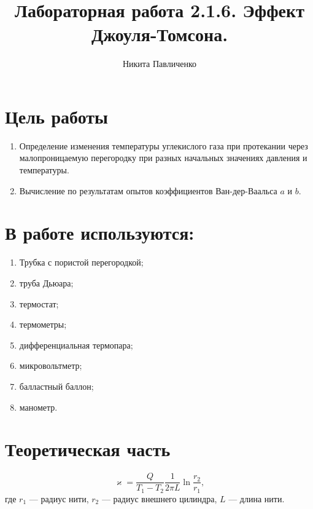 \documentclass[12pt]{article}
\title{Лабораторная работа 2.1.6. Эффект Джоуля-Томсона.}
\author{Никита Павличенко}
\begin{document}
\maketitle
{}%
\thispagestyle{fancy}
\newpage
\section{Цель работы}
\begin{enumerate}
    \item Определение изменения температуры углекислого газа при протекании через малопроницаемую перегородку при разных начальных значениях давления и температуры.
    \item Вычисление по результатам опытов коэффициентов Ван-дер-Ваальса $a$ и $b$.
\end{enumerate}
\section{В работе используются:}
\begin{enumerate}
    \item Трубка с пористой перегородкой;
    \item труба Дьюара;
    \item термостат;
    \item термометры;
    \item дифференциальная термопара;
    \item микровольтметр;
    \item балластный баллон;
    \item манометр.
\end{enumerate}

\section{Теоретическая часть}

\begin{equation}
    \varkappa = \frac{Q}{T_1 - T_2}\frac{1}{2\pi L}\ln\frac{r_2}{r_1}, 
\end{equation}
где $r_1$ — радиус нити, $r_2$ — радиус внешнего цилиндра, $L$ — длина нити.
\end{document}
